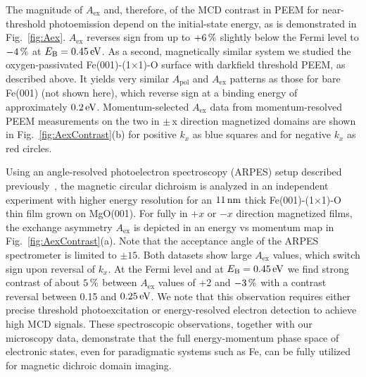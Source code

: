 \documentclass[prl,twocolumn,floatfix,superscriptaddress,aps]{revtex4-2}
\begin{document}
The magnitude of $A_{\mathrm{ex}}$ and, therefore, of the MCD contrast in PEEM for near-threshold photoemission depend on the initial-state energy, as is demonstrated in Fig.~\ref{fig:Aex}. $A_{\mathrm{ex}}$ reverses sign from up to $\unit[+6]{\%}$ slightly below the Fermi level to $\unit[-4]{\%}$ at $E_{\mathrm{B}} = \unit[0.45]{eV}$. 
As a second, magnetically similar system we studied the oxygen-passivated Fe(001)-(1$\times$1)-O surface with darkfield threshold PEEM, as described above. It yields very similar $A_{\mathrm{pol}}$ and $A_{\mathrm{ex}}$ patterns as those for bare Fe(001) (not shown here), which reverse sign at a binding energy of approximately $\unit[0.2]{eV}$. Momentum-selected $A_{\mathrm{ex}}$ data from momentum-resolved PEEM measurements on 
the two in $\pm$\,x direction magnetized domains are shown in Fig.~\ref{fig:AexContrast}(b) for positive $k_x$ as blue squares and for negative $k_x$ as red circles. 

Using an angle-resolved photoelectron spectroscopy (ARPES) setup described previously~\cite{gillmeister2018, gillmeister2020}, the magnetic circular dichroism is analyzed in an independent experiment with higher energy resolution for an $\unit[11]{nm}$ thick Fe(001)-(1$\times$1)-O thin film grown on MgO(001). For fully in $+x$ or $-x$ direction magnetized films, the exchange asymmetry $A_{\mathrm{ex}}$ is depicted in an energy vs momentum map in Fig.~\ref{fig:AexContrast}(a). Note that the acceptance angle of the ARPES spectrometer is limited to $\pm15$\textdegree. Both datasets show large $A_{\mathrm{ex}}$ values, which switch sign upon reversal of $k_x$. At the Fermi level and at $E_{\mathrm{B}} = \unit[0.45]{eV}$ we find strong contrast of about $\unit[5]{\%}$ between $A_{\mathrm{ex}}$ values of +2 and $\unit[-3]{\%}$ with a contrast reversal between 0.15 and $\unit[0.25]{eV}$. We note that this observation requires either precise threshold photoexcitation or energy-resolved electron detection to achieve high MCD signals.
These spectroscopic observations, together with our microscopy data, demonstrate that the full energy-momentum phase space of electronic states, even for paradigmatic systems such as Fe, can be fully utilized for magnetic dichroic domain imaging.
\end{document}

